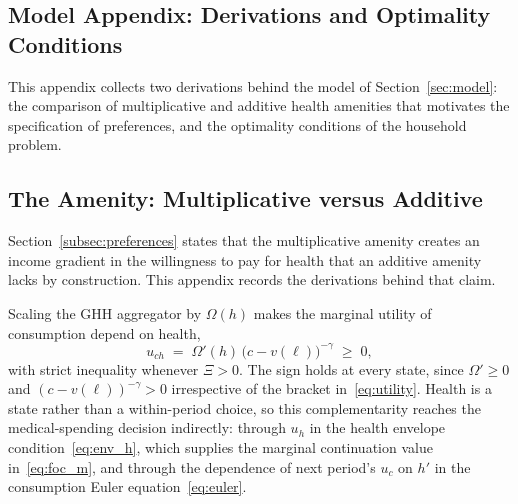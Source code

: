 \documentclass[12pt,a4paper]{article}
\begin{document}
\begin{appendices}

\section{Model Appendix: Derivations and Optimality Conditions}
\label{app:model}

This appendix collects two derivations behind the model of Section~\ref{sec:model}: the comparison of multiplicative and additive health amenities that motivates the specification of preferences, and the optimality conditions of the household problem.

\subsection{The Amenity: Multiplicative versus Additive}
\label{app:amenity}

Section~\ref{subsec:preferences} states that the multiplicative amenity creates an income gradient in the willingness to pay for health that an additive amenity lacks by construction. This appendix records the derivations behind that claim.

Scaling the GHH aggregator by $\Omega(h)$ makes the marginal utility of consumption depend on health,
\begin{equation}
\label{eq:u_ch}
u_{ch} \;=\; \Omega'(h)\,\bigl(c-v(\ell)\bigr)^{-\gamma} \;\geq\; 0,
\end{equation}
with strict inequality whenever $\Xi > 0$. The sign holds at every state, since $\Omega' \geq 0$ and $(c - v(\ell))^{-\gamma} > 0$ irrespective of the bracket in~\eqref{eq:utility}. Health is a state rather than a within-period choice, so this complementarity reaches the medical-spending decision indirectly: through $u_h$ in the health envelope condition~\eqref{eq:env_h}, which supplies the marginal continuation value in~\eqref{eq:foc_m}, and through the dependence of next period's $u_c$ on $h'$ in the consumption Euler equation~\eqref{eq:euler}.


\end{appendices}
\end{document}
